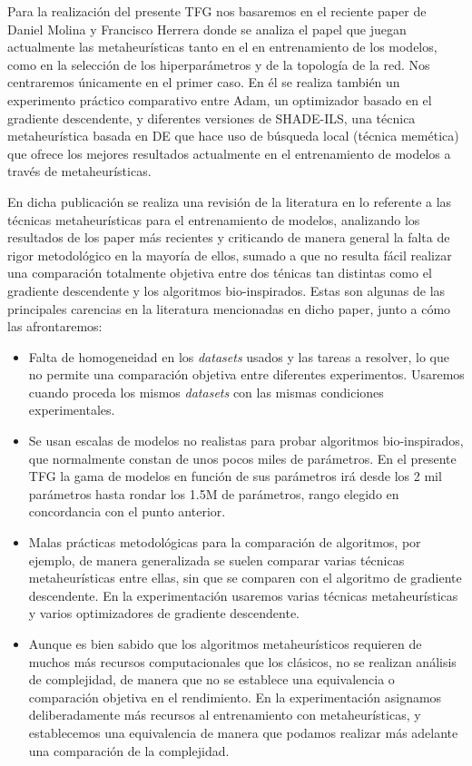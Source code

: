 Para la realización del presente TFG nos basaremos en el reciente paper de Daniel Molina y Francisco Herrera \cite{MHtrainingClase} donde se analiza el papel que juegan actualmente las metaheurísticas tanto en el en entrenamiento de los modelos, como en la selección de los hiperparámetros y de la topología de la red. Nos centraremos únicamente en el primer caso. En él se realiza también un experimento práctico comparativo entre Adam, un optimizador basado en el gradiente descendente, y diferentes versiones de SHADE-ILS, una técnica metaheurística basada en DE que hace uso de búsqueda local (técnica memética) que ofrece los mejores resultados actualmente en el entrenamiento de modelos a través de metaheurísticas.

En dicha publicación se realiza una revisión de la literatura en lo referente a las técnicas metaheurísticas para el entrenamiento de modelos, analizando los resultados de los paper más recientes y criticando de manera general la falta de rigor metodológico en la mayoría de ellos, sumado a que no resulta fácil realizar una comparación totalmente objetiva entre dos ténicas tan distintas como el gradiente descendente y los algoritmos bio-inspirados. Estas son algunas de las principales carencias en la literatura mencionadas en dicho paper, junto a cómo las afrontaremos:

\begin{itemize}

\item Falta de homogeneidad en los \textit{datasets} usados y las tareas a resolver, lo que no permite una comparación objetiva entre diferentes experimentos. Usaremos cuando proceda los mismos \textit{datasets} con las mismas condiciones experimentales.

\item Se usan escalas de modelos no realistas para probar algoritmos bio-inspirados, que normalmente constan de unos pocos miles de parámetros. En el presente TFG la gama de modelos en función de sus parámetros irá desde los 2 mil parámetros hasta rondar los 1.5M de parámetros, rango elegido en concordancia con el punto anterior.

\item Malas prácticas metodológicas para la comparación de algoritmos, por ejemplo, de manera generalizada se suelen comparar varias técnicas metaheurísticas entre ellas, sin que se comparen con el algoritmo de gradiente descendente. En la experimentación usaremos varias técnicas metaheurísticas y varios optimizadores de gradiente descendente.

\item Aunque es bien sabido que los algoritmos metaheurísticos requieren de muchos más recursos computacionales que los clásicos, no se realizan análisis de complejidad, de manera que no se establece una equivalencia o comparación objetiva en el rendimiento. En la experimentación asignamos deliberadamente más recursos al entrenamiento con metaheurísticas, y establecemos una equivalencia de manera que podamos realizar más adelante una comparación de la complejidad.
\end{itemize}

